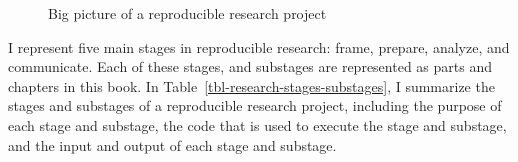 \documentclass[
  letterpaper,
]{book}
\theoremstyle{definition}
\theoremstyle{remark}
\begin{document}
\begin{figure}[!htb]


\caption{\label{fig-big-picture}Big picture of a reproducible research
project}

\end{figure}%

I represent five main stages in reproducible research: frame, prepare,
analyze, and communicate. Each of these stages, and substages are
represented as parts and chapters in this book. In
Table~\ref{tbl-research-stages-substages}, I summarize the stages and
substages of a reproducible research project, including the purpose of
each stage and substage, the code that is used to execute the stage and
substage, and the input and output of each stage and substage.
\end{document}
